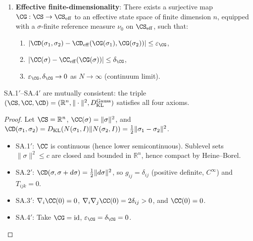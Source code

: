 \begin{definition}
\begin{enumerate}
  \item[\textbf{SA.4$'$}] \textbf{Effective finite-dimensionality}:
        There exists a surjective map $\CG : \CS \to \CS_{\mathrm{eff}}$
        to an effective state space of finite dimension $n$, equipped with
        a $\sigma$-finite reference measure $\nu_0$ on $\CS_{\mathrm{eff}}$,
        such that:
        \begin{enumerate}
          \item $|\CD(\sigma_1, \sigma_2)
                - \CD_{\mathrm{eff}}(\CG(\sigma_1), \CG(\sigma_2))|
                \leq \varepsilon_{\CG}$,
          \item $|\CC(\sigma) - \CC_{\mathrm{eff}}(\CG(\sigma))|
                \leq \delta_{\CG}$,
          \item $\varepsilon_{\CG}, \delta_{\CG} \to 0$ as
                $N \to \infty$ (continuum limit).
        \end{enumerate}
\end{enumerate}
\end{definition}

\begin{lemma}\label{lem:15.1}
SA.1$'$--SA.4$'$ are mutually consistent: the triple
$(\CS, \CC, \CD) = (\mathbb{R}^n, \|\cdot\|^2,
D_{\mathrm{KL}}^{\mathrm{Gauss}})$ satisfies all four axioms.
\end{lemma}

\begin{proof}
Let $\CS = \mathbb{R}^n$, $\CC(\sigma) = \|\sigma\|^2$, and
$\CD(\sigma_1, \sigma_2) = D_{\mathrm{KL}}(N(\sigma_1, I) \|
N(\sigma_2, I)) = \frac{1}{2}\|\sigma_1 - \sigma_2\|^2$.
\begin{itemize}
  \item SA.1$'$: $\CC$ is continuous (hence lower semicontinuous).
        Sublevel sets $\|\sigma\|^2 \leq c$ are closed and bounded in
        $\mathbb{R}^n$, hence compact by Heine--Borel.
  \item SA.2$'$: $\CD(\sigma, \sigma + d\sigma) =
        \frac{1}{2}\|d\sigma\|^2$, so $g_{ij} = \delta_{ij}$
        (positive definite, $C^\infty$) and $T_{ijk} = 0$.
  \item SA.3$'$: $\nabla_i \CC(0) = 0$, $\nabla_i \nabla_j \CC(0) =
        2\delta_{ij} > 0$, and $\CC(0) = 0$.
  \item SA.4$'$: Take $\CG = \mathrm{id}$, $\varepsilon_{\CG} =
        \delta_{\CG} = 0$.
\end{itemize}
\end{proof}

